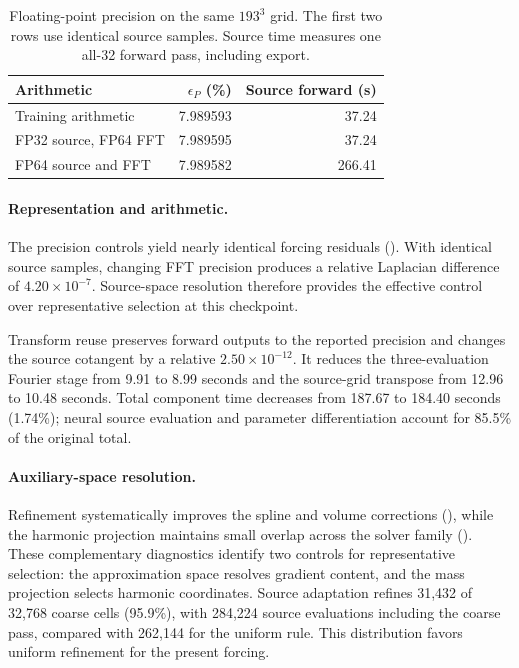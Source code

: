 \begin{table}[!htb]
\centering\small
\caption{Floating-point precision on the same $193^3$ grid. The first two rows use identical source samples. Source time measures one all-32 forward pass, including export.}
\label{tab:gauge-precision}
\begin{tabular}{lrr}\toprule
Arithmetic & $\epsilon_P$ (\%) & Source forward (s)\\\midrule
Training arithmetic & 7.989593 & 37.24 \\
FP32 source, FP64 FFT & 7.989595 & 37.24 \\
FP64 source and FFT & 7.989582 & 266.41 \\
\bottomrule\end{tabular}\end{table}
\paragraph{Representation and arithmetic.}
The precision controls yield nearly identical forcing residuals (). With identical source samples, changing FFT precision produces a relative Laplacian difference of $4.20\times10^{-7}$. Source-space resolution therefore provides the effective control over representative selection at this checkpoint.

Transform reuse preserves forward outputs to the reported precision and changes the source cotangent by a relative $2.50\times10^{-12}$. It reduces the three-evaluation Fourier stage from 9.91 to 8.99 seconds and the source-grid transpose from 12.96 to 10.48 seconds. Total component time decreases from 187.67 to 184.40 seconds (1.74\%); neural source evaluation and parameter differentiation account for 85.5\% of the original total.

\paragraph{Auxiliary-space resolution.}
Refinement systematically improves the spline and volume corrections (), while the harmonic projection maintains small overlap across the solver family (). These complementary diagnostics identify two controls for representative selection: the approximation space resolves gradient content, and the mass projection selects harmonic coordinates. Source adaptation refines 31,432 of 32,768 coarse cells (95.9\%), with 284,224 source evaluations including the coarse pass, compared with 262,144 for the uniform rule. This distribution favors uniform refinement for the present forcing.
